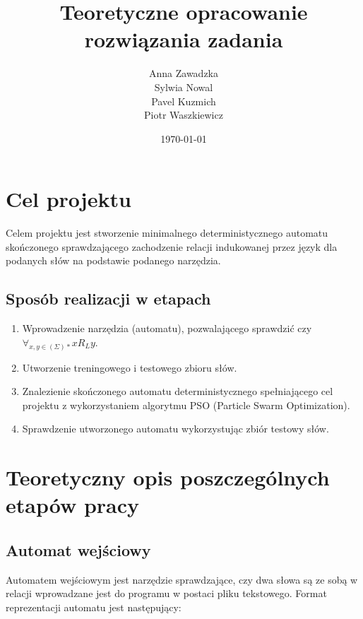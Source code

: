 \documentclass{mini}
\title{Teoretyczne opracowanie rozwiązania zadania}
\author{Anna Zawadzka\\Sylwia Nowal\\Pavel Kuzmich\\Piotr Waszkiewicz}
\date{\today}
\begin{document}
\maketitle
\tableofcontents


\chapter{Cel projektu}

Celem projektu jest stworzenie minimalnego deterministycznego automatu skończonego sprawdzającego zachodzenie relacji indukowanej przez język dla podanych słów na podstawie podanego narzędzia.

\section{Sposób realizacji w etapach}

\begin{enumerate}
	\item Wprowadzenie narzędzia (automatu), pozwalającego sprawdzić czy $\forall_{x,y \in (\Sigma)*} x R_{L} y$.
	\item Utworzenie treningowego i testowego zbioru słów.
	\item Znalezienie skończonego automatu deterministycznego spełniającego cel projektu z wykorzystaniem algorytmu PSO (Particle Swarm Optimization).
	\item Sprawdzenie utworzonego automatu wykorzystując zbiór testowy słów.
\end{enumerate}

\chapter{Teoretyczny opis poszczególnych etapów pracy}

\section{Automat wejściowy}

Automatem wejściowym jest narzędzie sprawdzające, czy dwa słowa są ze sobą w relacji wprowadzane jest do programu w postaci pliku tekstowego. Format reprezentacji automatu jest następujący:
\end{document}
